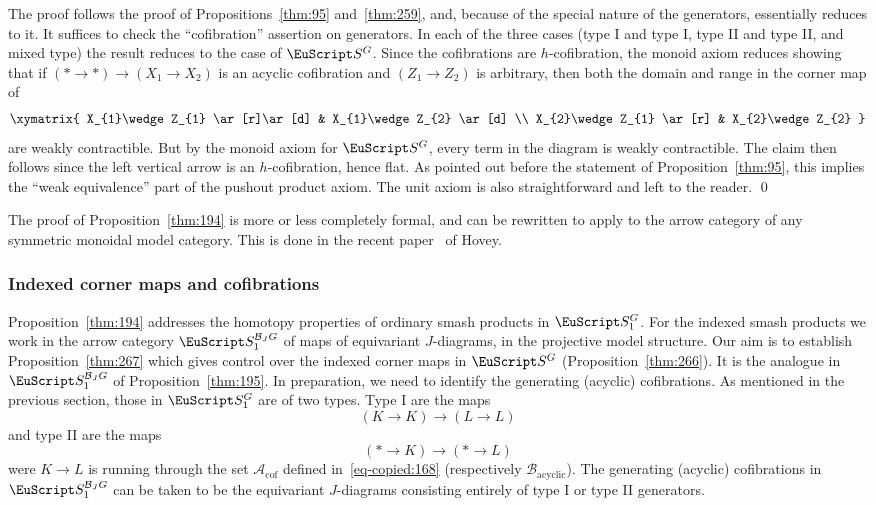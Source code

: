 \documentclass{amsart}
\theoremstyle{definition}
\theoremstyle{remark}
\newenvironment{pf}{\bigskip{\em Proof:\/}}{\qed\medskip}
\newcommand{\spectra}{\EuScript S}
\newcommand{\ugspectra}[1]{\spectra^{#1}}
\newcommand{\cat}[1]{{\mathcal #1}}
\newcommand{\augspectra}[1]{\spectra_{1}^{#1}}
\newcommand{\aspectra}[1]{\spectra_{1}^{#1}}
\newcommand{\gencof}{\mathcal A_{\text{cof}}}
\newcommand{\genacyclic}{\mathcal B_{\text{acyclic}}}
\begin{document}
\begin{pf}
The proof follows the proof of Propositions~\ref{thm:95}
and~\ref{thm:259}, and, because of the special nature of the
generators, essentially reduces to it.  It suffices to check the
``cofibration'' assertion on generators.  In each of the three cases
(type I and type I, type II and type II, and mixed type) the result
reduces to the case of $\ugspectra{G}$.  Since the cofibrations are
$h$-cofibration, the monoid axiom reduces showing that if
$(\ast\to\ast)\to (X_{1}\to X_{2})$ is an acyclic cofibration and
$(Z_{1}\to Z_{2})$ is arbitrary, then both the domain and range in the
corner map of
\[
\xymatrix{
X_{1}\wedge Z_{1}  \ar[r]\ar[d]  & X_{1}\wedge Z_{2}
\ar[d] \\
X_{2}\wedge Z_{1}  \ar[r]        & X_{2}\wedge Z_{2}
}
\]
are weakly contractible.  But by the monoid axiom for $\ugspectra{G}$,
every term in the diagram is weakly contractible.  The claim then
follows since the left vertical arrow is an $h$-cofibration, hence
flat.  As pointed out before the statement of
Proposition~\ref{thm:95}, this implies the ``weak equivalence'' part
of the pushout product axiom.  The unit axiom is also straightforward
and left to the reader.
\end{pf}

The proof of Proposition~\ref{thm:194} is more or less completely
formal, and can be rewritten to apply to the arrow category of any
symmetric monoidal model category.  This is done in the recent
paper~\cite{hovey:_smith} of Hovey.

\subsubsection{Indexed corner maps and cofibrations}
\label{sec:indexed-corner-maps-1}

Proposition~\ref{thm:194} addresses the homotopy properties of
ordinary smash products in $\augspectra{G}$.  For the indexed smash
products we work in the arrow category $\aspectra{\cat{B}_{J}G}$ of
maps of equivariant $J$-diagrams, in the projective model structure.
Our aim is to establish Proposition~\ref{thm:267} which gives control
over the indexed corner maps in $\ugspectra{G}$
(Proposition~\ref{thm:266}).  It is the analogue in
$\aspectra{\cat{B}_{J}G}$ of Proposition~\ref{thm:195}.  In
preparation, we need to identify the generating (acyclic)
cofibrations.  As mentioned in the previous section, those in
$\augspectra{G}$ are of two types.  Type I are the maps
\[
(K\to K) \to (L\to L)
\]
and type II are the maps 
\[
(\ast\to K) \to (\ast \to L)
\]
were $K\to L$ is running through the set $\gencof$ defined
in~\eqref{eq-copied:168} (respectively $\genacyclic$). 
The generating (acyclic) cofibrations in $\aspectra{\cat{B}_{J}G}$ can be
taken to be the equivariant $J$-diagrams consisting entirely of type I
or type II generators.
\end{document}
